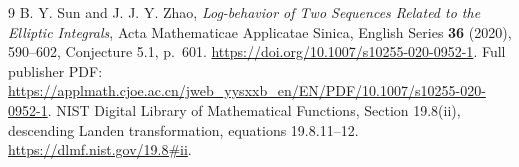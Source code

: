 \documentclass[11pt]{article}
\begin{document}
\begin{thebibliography}{9}
B. Y. Sun and J. J. Y. Zhao, \emph{Log-behavior of Two Sequences Related
to the Elliptic Integrals}, Acta Mathematicae Applicatae Sinica,
English Series \textbf{36} (2020), 590--602, Conjecture 5.1, p.~601.
\url{https://doi.org/10.1007/s10255-020-0952-1}.
Full publisher PDF:
\url{https://applmath.cjoe.ac.cn/jweb_yysxxb_en/EN/PDF/10.1007/s10255-020-0952-1}.
NIST Digital Library of Mathematical Functions, Section 19.8(ii),
descending Landen transformation, equations 19.8.11--12.
\url{https://dlmf.nist.gov/19.8#ii}.
\end{thebibliography}
\end{document}
